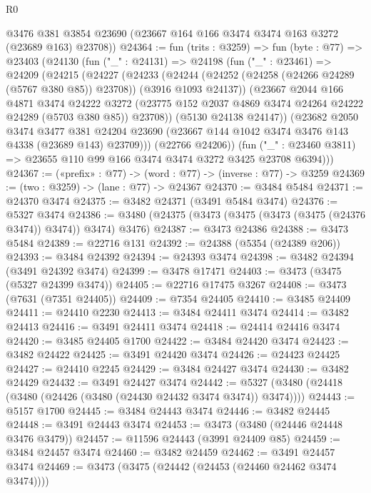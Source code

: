 \begin{lexlean}{R0}
\begin{coremodule}
      @3476
      @381
      @3854
      @23690
      (@23667 @164 @166 @3474 @3474 @163 @3272 (@23689 @163) @23708))
@24364 := fun (trits : @3259) =>
  fun (byte : @77) =>
  @23403
    (@24130
      (fun ("_" : @24131) =>
      @24198
        (fun ("_" : @23461) =>
        @24209
          (@24215
            (@24227
              (@24233
                (@24244
                  (@24252 (@24258 (@24266 @24289 (@5767 @380 @85)) @23708))
                  (@3916 @1093 @24137))
                (@23667
                  @2044
                  @166
                  @4871
                  @3474
                  @24222
                  @3272
                  (@23775 @152 @2037 @4869 @3474 @24264 @24222 @24289 (@5703 @380 @85))
                  @23708))
              (@5130 @24138 @24147))
            (@23682
              @2050
              @3474
              @3477
              @381
              @24204
              @23690
              (@23667 @144 @1042 @3474 @3476 @143 @4338 (@23689 @143) @23709)))
          (@22766 @24206))
        (fun ("_" : @23460 @3811) => @23655 @110 @99 @166 @3474 @3474 @3272 @3425 @23708 @6394)))
@24367 := («prefix» : @77) -> (word : @77) -> (inverse : @77) -> @3259
@24369 := (two : @3259) -> (lane : @77) -> @24367
@24370 := @3484 @5484
@24371 := @24370 @3474
@24375 := @3482 @24371 (@3491 @5484 @3474)
@24376 := @5327 @3474
@24386 := @3480 (@24375 (@3473 (@3475 (@3473 (@3475 (@24376 @3474)) @3474)) @3474) @3476)
@24387 := @3473 @24386
@24388 := @3473 @5484
@24389 := @22716 @131
@24392 := @24388 (@5354 (@24389 @206))
@24393 := @3484 @24392
@24394 := @24393 @3474
@24398 := @3482 @24394 (@3491 @24392 @3474)
@24399 := @3478 @17471
@24403 := @3473 (@3475 (@5327 @24399 @3474))
@24405 := @22716 @17475 @3267
@24408 := @3473 (@7631 (@7351 @24405))
@24409 := @7354 @24405
@24410 := @3485 @24409
@24411 := @24410 @2230
@24413 := @3484 @24411 @3474
@24414 := @3482 @24413
@24416 := @3491 @24411 @3474
@24418 := @24414 @24416 @3474
@24420 := @3485 @24405 @1700
@24422 := @3484 @24420 @3474
@24423 := @3482 @24422
@24425 := @3491 @24420 @3474
@24426 := @24423 @24425
@24427 := @24410 @2245
@24429 := @3484 @24427 @3474
@24430 := @3482 @24429
@24432 := @3491 @24427 @3474
@24442 := @5327 (@3480 (@24418 (@3480 (@24426 (@3480 (@24430 @24432 @3474 @3474)) @3474))))
@24443 := @5157 @1700
@24445 := @3484 @24443 @3474
@24446 := @3482 @24445
@24448 := @3491 @24443 @3474
@24453 := @3473 (@3480 (@24446 @24448 @3476 @3479))
@24457 := @11596 @24443 (@3991 @24409 @85)
@24459 := @3484 @24457 @3474
@24460 := @3482 @24459
@24462 := @3491 @24457 @3474
@24469 := @3473 (@3475 (@24442 (@24453 (@24460 @24462 @3474 @3474))))

\end{coremodule}
\end{lexlean}
